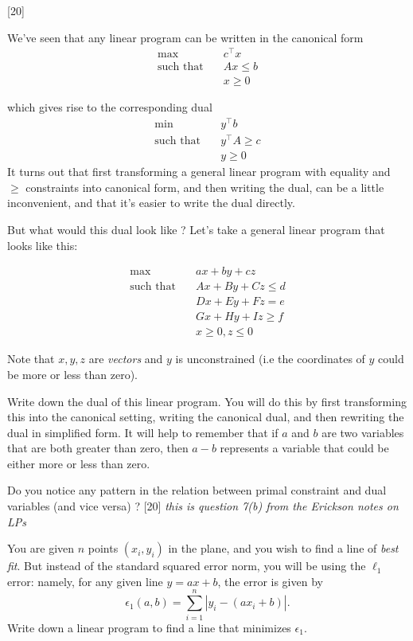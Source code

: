 \documentclass[addpoints]{exam}
\begin{document}
\begin{questions}


[20]

We've seen that any linear program can be written in the canonical form 
\begin{align*}
  \max \qquad & c^\top x \\
  \text{such that} \quad & Ax \le b \\
  & x \ge 0
\end{align*}

which gives rise to the corresponding dual
\begin{align*}
  \min \qquad & y^\top b \\
  \text{such that} \quad & y^\top A \ge c \\
  & y \ge 0
\end{align*}
It turns out that first transforming a general linear program with equality and
$\ge$ constraints into canonical form, and then writing the dual, can be a
little inconvenient, and that it's easier to write the dual directly. 

But what would this dual look like ? Let's take a general linear program that
looks like this: 

\begin{align*}
\max \qquad & ax + by + cz \\
\text{such that} \quad & Ax + By + Cz \le d \\
& Dx + Ey + Fz = e \\
& Gx + Hy + Iz \ge f \\
& x \ge 0, z \le 0
\end{align*}

Note that $x, y, z$ are \emph{vectors} and $y$ is unconstrained (i.e the
coordinates of $y$ could be more or less than zero). 

Write down the dual of this linear program. You will do this by first
transforming this into the canonical setting, writing the canonical dual, and
then rewriting the dual in simplified form. It will help to remember that if $a$
and $b$ are two variables that are both greater than zero, then $a-b$ represents
a variable that could be either more or less than zero. 

Do you notice any pattern in the relation between primal constraint and dual
variables (and vice versa) ? 
[20]
\emph{this is question 7(b) from the Erickson notes on LPs}

You are given $n$ points $(x_i, y_i)$ in the plane, and you wish to find a line
of \emph{best fit}. But instead of the standard squared error norm, you will be
using the $\ell_1$ error: namely, for any given line $y = ax + b$, the error is
given by 
\[ \epsilon_1(a, b) = \sum_{i=1}^n |y_i - (ax_i + b)|. \]
Write down a linear program to find a line that minimizes $\epsilon_1$. 
\end{questions}
\end{document}
